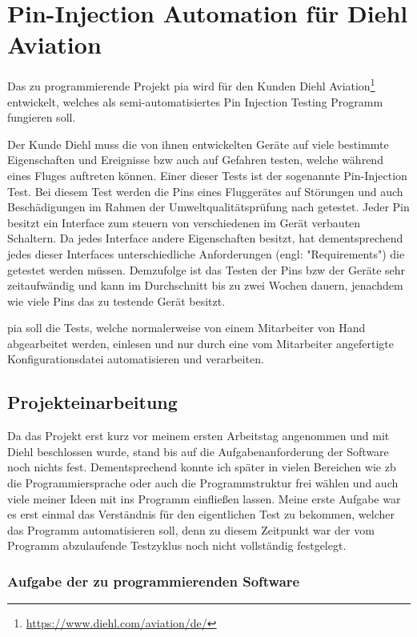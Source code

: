 \chapter{Pin-Injection Automation für Diehl Aviation}
\label{ch:pia}

Das zu programmierende Projekt \ac{pia} wird für den Kunden Diehl Aviation\footnote{\url{https://www.diehl.com/aviation/de/}} entwickelt, welches als semi-automatisiertes Pin Injection Testing Programm fungieren soll.

Der Kunde Diehl muss die von ihnen entwickelten Geräte auf viele bestimmte Eigenschaften und Ereignisse \ac{bzw} auch auf Gefahren testen, welche während eines Fluges auftreten können. Einer dieser Tests ist der sogenannte Pin-Injection Test.
Bei diesem Test werden die Pins eines Fluggerätes auf Störungen und auch Beschädigungen im Rahmen der Umweltqualitätsprüfung nach \cite{DO-160} getestet. Jeder Pin besitzt ein Interface zum steuern von verschiedenen im Gerät verbauten Schaltern. Da jedes Interface andere Eigenschaften besitzt, hat dementsprechend jedes dieser Interfaces unterschiedliche Anforderungen (engl: "Requirements") die getestet werden müssen.
Demzufolge ist das Testen der Pins \ac{bzw} der Geräte sehr zeitaufwändig und kann im Durchschnitt bis zu zwei Wochen dauern, jenachdem wie viele Pins das zu testende Gerät besitzt.

\ac{pia} soll die Tests, welche normalerweise von einem Mitarbeiter von Hand abgearbeitet werden, einlesen und nur durch eine vom Mitarbeiter angefertigte Konfigurationsdatei automatisieren und verarbeiten.


\section{Projekteinarbeitung}
\label{sec:prj-einarbeitung}

Da das Projekt erst kurz vor meinem ersten Arbeitstag angenommen und mit Diehl beschlossen wurde, stand bis auf die Aufgabenanforderung der Software noch nichts fest. Dementsprechend konnte ich später in vielen Bereichen wie \ac{zb} die Programmiersprache oder auch die Programmstruktur frei wählen und auch viele meiner Ideen mit ins Programm einfließen lassen. Meine erste Aufgabe war es erst einmal das Verständnis für den eigentlichen Test zu bekommen, welcher das Programm automatisieren soll, denn zu diesem Zeitpunkt war der vom Programm abzulaufende Testzyklus noch nicht vollständig festgelegt. 


\subsection{Aufgabe der zu programmierenden Software}
\label{subsec:aufgabe-software}

